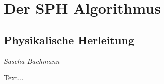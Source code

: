 \chapter{Der SPH Algorithmus}
\label{chap:sph}
\thispagestyle{empty}

\section{Physikalische Herleitung}

\begin{center}
\emph{{\small Sascha Bachmann}}
\end{center}

\bigskip

Text...
